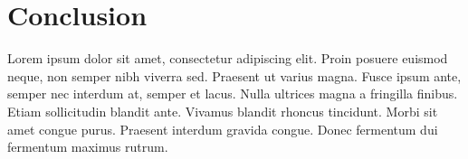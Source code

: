 \section{Conclusion}
Lorem ipsum dolor sit amet, consectetur adipiscing elit. Proin posuere euismod neque, non semper nibh viverra sed. Praesent ut varius magna. Fusce ipsum ante, semper nec interdum at, semper et lacus. Nulla ultrices magna a fringilla finibus. Etiam sollicitudin blandit ante. Vivamus blandit rhoncus tincidunt. Morbi sit amet congue purus. Praesent interdum gravida congue. Donec fermentum dui fermentum maximus rutrum.




